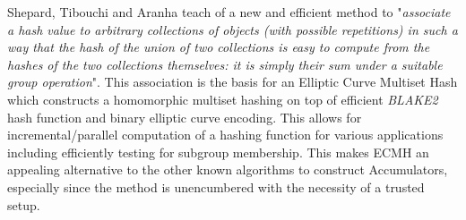 Shepard, Tibouchi and Aranha \cite{ecmh} teach of a new and efficient method to "\textit{associate a hash value to arbitrary collections of objects (with possible repetitions) in such a way that the hash of the union of two collections is easy to compute from the hashes of the two collections themselves:  it is simply their sum under a suitable group operation}". This association is the basis for an Elliptic Curve Multiset Hash which constructs a homomorphic multiset hashing on top of efficient \textit{BLAKE2} hash function and binary elliptic curve encoding. This allows for incremental/parallel computation of a hashing function for various applications including efficiently testing for subgroup membership. This makes ECMH an appealing alternative to the other known algorithms to construct Accumulators, especially since the method is unencumbered with the necessity of a trusted setup.

